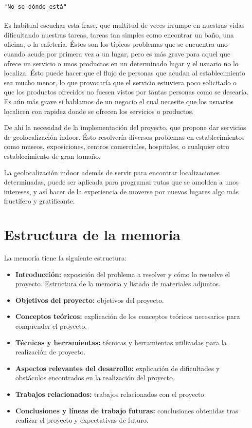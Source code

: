 
\texttt{"No se dónde está"}\\
\\
Es habitual escuchar esta frase, que multitud de veces irrumpe en nuestras vidas dificultando nuestras tareas, tareas
tan simples como encontrar un baño, una oficina, o la cafetería. Éstos son los típicos problemas que se encuentra uno 
cuando acude por primera vez a un lugar, pero es más grave para aquel que ofrece un servicio o unos productos en un 
determinado lugar y el usuario no lo localiza. Ésto puede hacer que el flujo de personas que acudan al establecimiento 
sea mucho menor, lo que provocaría que el servicio estuviera poco solicitado o que los productos ofrecidos no fuesen vistos 
por tantas personas como se desearía. Es aún más grave si hablamos de un negocio el cual necesite que los usuarios localicen
con rapidez donde se ofrecen los servicios o productos. 
 
De ahí la necesidad de la implementación del proyecto, que propone dar servicios de geolocalización indoor. Ésto resolvería 
diversos problemas en establecimientos como museos, exposiciones, centros comerciales, hospitales,
o cualquier otro establecimiento de gran tamaño.

La geolocalización indoor además de servir para encontrar localizaciones determinadas, puede ser aplicada para programar 
rutas que se amolden a unos intereses, y así hacer de la experiencia de moverse por nuevos lugares algo más fructífero y gratificante.

\section{Estructura de la memoria}\label{estructura-de-la-memoria}

La memoria tiene la siguiente estructura:

\begin{itemize}
\tightlist
\item
  \textbf{Introducción:} exposición del problema a resolver y cómo lo resuelve el proyecto.
   Estructura de la memoria y listado de materiales
  adjuntos.
\item
  \textbf{Objetivos del proyecto:} objetivos del proyecto.
\item
  \textbf{Conceptos teóricos:} explicación de los conceptos teóricos necesarios para comprender el proyecto.
\item
  \textbf{Técnicas y herramientas:} técnicas y herramientas utilizadas para la realización de proyecto.
\item
  \textbf{Aspectos relevantes del desarrollo:} explicación de dificultades y obstáculos encontrados en la realización del proyecto.
\item
  \textbf{Trabajos relacionados:} trabajos relacionados con el proyecto.
\item
  \textbf{Conclusiones y líneas de trabajo futuras:} conclusiones
  obtenidas tras realizar el proyecto y expectativas de futuro.
\end{itemize}

